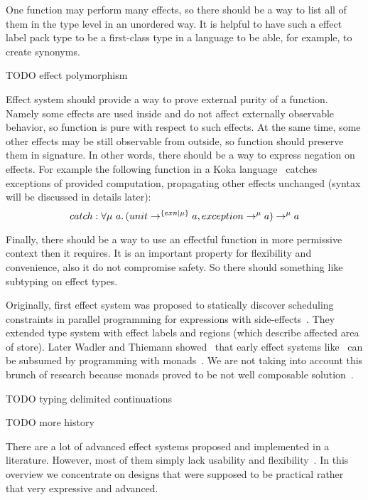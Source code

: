 \documentclass[conference]{IEEEtran}
\newcommand{\ap}{~}
\begin{document}
    One function may perform many effects, so there should be a way to list all of them in the type level in an unordered way.
    It is helpful to have such a effect label pack type to be a first-class type in a language to be able, for example, to create synonyms.

    TODO effect polymorphism %

    Effect system should provide a way to prove external purity of a function.
    Namely some effects are used inside and do not affect externally observable behavior, so function is pure with respect to such effects.
    At the same time, some other effects may be still observable from outside, so function should preserve them in signature.
    In other words, there should be a way to express negation on effects.
    For example the following function in a Koka language~\cite{koka} catches exceptions of provided computation, propagating other effects unchanged (syntax will be discussed in details later):
    \[catch : \forall \mu\ap a\ldotp (unit\to^{\{exn|\mu\}} a, exception \to^{\mu} a) \to^\mu a\]

    Finally, there should be a way to use an effectful function in more permissive context then it requires.
    It is an important property for flexibility and convenience, also it do not compromise safety.
    So there should something like subtyping on effect types.

    Originally, first effect system was proposed to statically discover scheduling constraints in parallel programming for expressions with side-effects~\cite{first-effect-system}.
    They extended type system with effect labels and regions (which describe affected area of store).
    Later Wadler and Thiemann showed~\cite{marriage} that early effect systems like~\cite{first-effect-system} can be subsumed by programming with monads~\cite{monads}.
    We are not taking into account this brunch of research because monads proved to be not well composable solution~\cite{transformers, extensible-effects}.

    TODO typing delimited continuations %

    TODO more history %

    There are a lot of advanced effect systems proposed and implemented in a literature.
    However, most of them simply lack usability and flexibility~\cite{scoped-capabilities}.
    In this overview we concentrate on designs that were supposed to be practical rather that very expressive and advanced.
\end{document}
